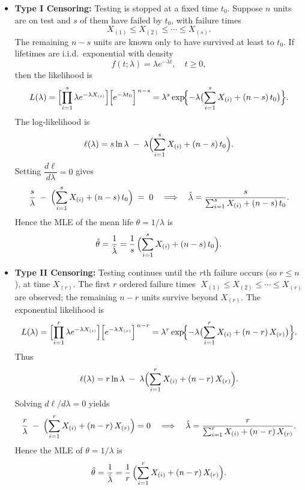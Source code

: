 \documentclass[twoside]{book}
\begin{document}
\begin{itemize}
  \item \textbf{Type I Censoring:}
    Testing is stopped at a fixed time \(t_0\). Suppose \(n\) units are on test and \(s\) of them have failed by \(t_0\), with failure times
    \[
      X_{(1)} \le X_{(2)} \le \cdots \le X_{(s)}.
    \]
    The remaining \(n - s\) units are known only to have survived at least to \(t_0\).  If lifetimes are i.i.d.\ exponential with density
    \[
      f(t;\lambda) = \lambda e^{-\lambda t},\quad t\ge0,
    \]
    then the likelihood is
    \[
      L(\lambda)
      = \Bigl[\prod_{i=1}^s \lambda e^{-\lambda X_{(i)}}\Bigr]
        \Bigl[e^{-\lambda t_0}\Bigr]^{\,n-s}
      = \lambda^s \exp\!\Bigl\{-\lambda\bigl(\sum_{i=1}^s X_{(i)} + (n-s)\,t_0\bigr)\Bigr\}.
    \]
    The log‐likelihood is
    \[
      \ell(\lambda)
      = s\ln\lambda \;-\;\lambda\Bigl(\sum_{i=1}^s X_{(i)} + (n-s)\,t_0\Bigr).
    \]
    Setting \(\dfrac{d\ell}{d\lambda}=0\) gives
    \[
      \frac{s}{\lambda} \;-\;\Bigl(\sum_{i=1}^s X_{(i)} + (n-s)\,t_0\Bigr)
      \;=\;0
      \quad\Longrightarrow\quad
      \hat\lambda
      = \frac{s}{\sum_{i=1}^s X_{(i)} + (n-s)\,t_0}.
    \]
    Hence the MLE of the mean life \(\theta=1/\lambda\) is
    \[
      \hat\theta
      = \frac{1}{\hat\lambda}
      = \frac{1}{s}\,\Bigl(\sum_{i=1}^s X_{(i)} + (n-s)\,t_0\Bigr).
    \]

    \bigskip

  \item \textbf{Type II Censoring:}
    Testing continues until the \(r\)th failure occurs (so \(r\le n\)), at time \(X_{(r)}\).  The first \(r\) ordered failure times
    \(\;X_{(1)}\le X_{(2)}\le\cdots\le X_{(r)}\!\)\; are observed; the remaining \(n-r\) units survive beyond \(X_{(r)}\).  The exponential likelihood is
    \[
      L(\lambda)
      = \Bigl[\prod_{i=1}^r \lambda e^{-\lambda X_{(i)}}\Bigr]
        \Bigl[e^{-\lambda X_{(r)}}\Bigr]^{\,n-r}
      = \lambda^r \exp\!\Bigl\{-\lambda\bigl(\sum_{i=1}^r X_{(i)} + (n-r)\,X_{(r)}\bigr)\Bigr\}.
    \]
    Thus
    \[
      \ell(\lambda)
      = r\ln\lambda \;-\;\lambda\Bigl(\sum_{i=1}^r X_{(i)} + (n-r)\,X_{(r)}\Bigr).
    \]
    Solving \(d\ell/d\lambda=0\) yields
    \[
      \frac{r}{\lambda} \;-\;\Bigl(\sum_{i=1}^r X_{(i)} + (n-r)\,X_{(r)}\Bigr)
      =0
      \quad\Longrightarrow\quad
      \hat\lambda
      = \frac{r}{\sum_{i=1}^r X_{(i)} + (n-r)\,X_{(r)}}.
    \]
    Hence the MLE of \(\theta=1/\lambda\) is
    \[
      \hat\theta
      = \frac{1}{\hat\lambda}
      = \frac{1}{r}\,\Bigl(\sum_{i=1}^r X_{(i)} + (n-r)\,X_{(r)}\Bigr).
    \]
\end{itemize}
\end{document}
